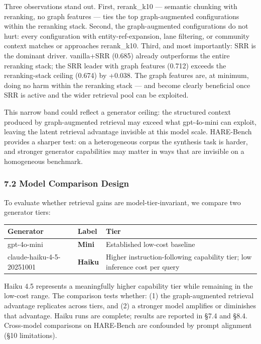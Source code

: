\documentclass[
]{article}
\begin{document}
Three observations stand out. First, rerank\_k10 --- semantic chunking
with reranking, no graph features --- ties the top graph-augmented
configurations within the reranking stack. Second, the graph-augmented
configurations do not hurt: every configuration with
entity-ref-expansion, lane filtering, or community context matches or
approaches rerank\_k10. Third, and most importantly: SRR is the dominant
driver. vanilla+SRR (0.685) already outperforms the entire reranking
stack; the SRR leader with graph features (0.712) exceeds the
reranking-stack ceiling (0.674) by +0.038. The graph features are, at
minimum, doing no harm within the reranking stack --- and become clearly
beneficial once SRR is active and the wider retrieval pool can be
exploited.

This narrow band could reflect a generator ceiling: the structured
context produced by graph-augmented retrieval may exceed what
gpt-4o-mini can exploit, leaving the latent retrieval advantage
invisible at this model scale. HARE-Bench provides a sharper test: on a
heterogeneous corpus the synthesis task is harder, and stronger
generator capabilities may matter in ways that are invisible on a
homogeneous benchmark.

\subsubsection{7.2 Model Comparison
Design}\label{model-comparison-design}

To evaluate whether retrieval gains are model-tier-invariant, we compare
two generator tiers:

\begin{small}
\setlength{\tabcolsep}{4pt}
\begin{longtable}{p{1.8in}p{0.8in}p{3.5in}}
\toprule
\textbf{Generator} & \textbf{Label} & \textbf{Tier} \\
\midrule
\endhead
gpt-4o-mini & \textbf{Mini} & Established low-cost baseline \\
claude-haiku-4-5-20251001 & \textbf{Haiku} & Higher instruction-following capability tier; low inference cost per query \\
\bottomrule
\end{longtable}
\end{small}

Haiku 4.5 represents a meaningfully higher capability tier while
remaining in the low-cost range. The comparison tests whether: (1) the
graph-augmented retrieval advantage replicates across tiers, and (2) a
stronger model amplifies or diminishes that advantage. Haiku runs are
complete; results are reported in §7.4 and §8.4. Cross-model comparisons
on HARE-Bench are confounded by prompt alignment (§10 limitations).
\end{document}

